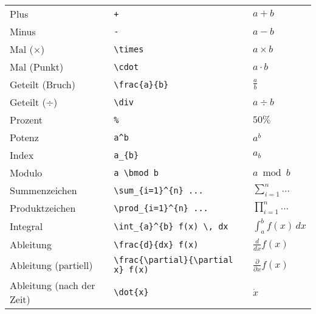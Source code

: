 \begin{longtable}{l l l}
    \midrule
    Plus                      & \texttt{+}                                                                              & $ a + b $                            \\
    Minus                     & \texttt{-}                                                                              & $ a - b $                            \\
    Mal (×)                   & \texttt{\textbackslash times}                                                           & $ a \times b $                       \\
    Mal (Punkt)               & \texttt{\textbackslash cdot}                                                            & $ a \cdot b $                        \\
    Geteilt (Bruch)           & \texttt{\textbackslash frac\{a\}\{b\}}                                                  & $ \frac{a}{b} $                      \\
    Geteilt (÷)               & \texttt{\textbackslash div}                                                             & $ a \div b $                         \\
    Prozent                   & \texttt{\%}                                                                             & $ 50\% $                             \\
    Potenz                    & \texttt{a\^{}b}                                                                         & $ a^b $                              \\
    Index                     & \texttt{a\_\{b\}}                                                                       & $ a_b $                              \\
    Modulo                    & \texttt{a \textbackslash bmod b}                                                        & $ a \bmod b $                        \\

    \midrule
    Summenzeichen             & \texttt{\textbackslash sum\_\{i=1\}\^{}\{n\} ...}                                       & $ \sum_{i=1}^{n} ... $               \\
    Produktzeichen            & \texttt{\textbackslash prod\_\{i=1\}\^{}\{n\} ...}                                      & $ \prod_{i=1}^{n} ... $              \\
    Integral                  & \texttt{\textbackslash int\_\{a\}\^{}\{b\} f(x) \textbackslash, dx}                     & $ \int_{a}^{b} f(x) \,dx $           \\
    Ableitung                 & \texttt{\textbackslash frac\{d\}\{dx\} f(x)}                                            & $ \frac{d}{dx} f(x) $                \\
    Ableitung (partiell)      & \texttt{\textbackslash frac\{\textbackslash partial\}\{\textbackslash partial x\} f(x)} & $ \frac{\partial}{\partial x} f(x) $ \\
    Ableitung (nach der Zeit) & \texttt{\textbackslash dot\{x\}}                                                        & $ \dot{x} $                          \\


\end{longtable}
